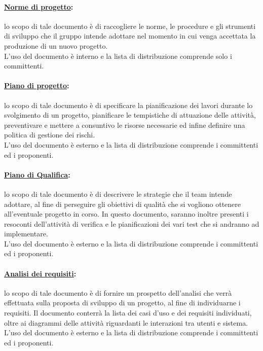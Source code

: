 \paragraph{\underline{Norme di progetto}:} lo scopo di tale documento è di raccogliere le norme, le procedure e gli strumenti di sviluppo che il gruppo \authorName{} intende adottare nel momento in cui venga accettata la produzione di un nuovo progetto.\\
L'uso del documento è interno e la lista di distribuzione comprende solo i committenti.

\paragraph{\underline{Piano di progetto}:} lo scopo di tale documento è di specificare la pianificazione dei lavori durante lo svolgimento di un progetto, pianificare le tempistiche di attuazione delle attività, preventivare e mettere a consuntivo le risorse necessarie ed infine definire una politica di gestione dei rischi.\\
L'uso del documento è esterno e la lista di distribuzione comprende i committenti ed i proponenti.

\paragraph{\underline{Piano di Qualifica}:} lo scopo di tale documento è di descrivere le strategie che il team intende adottare, al fine di perseguire gli obiettivi di qualità che si vogliono ottenere all'eventuale progetto in corso. In questo documento, saranno inoltre presenti i resoconti dell'attività di verifica e le pianificazioni dei vari test che si andranno ad implementare.\\
L'uso del documento è esterno e la lista di distribuzione comprende i committenti ed i proponenti.

\paragraph{\underline{Analisi dei requisiti}:} lo scopo di tale documento è di fornire un prospetto dell'analisi che verrà effettuata sulla proposta di sviluppo di un progetto, al fine di individuarne i requisiti. Il documento conterrà la lista dei casi d'uso e dei requisiti individuati, oltre ai diagrammi delle attività riguardanti le interazioni tra utenti e sistema.\\
L'uso del documento è esterno e la lista di distribuzione comprende i committenti ed i proponenti.

